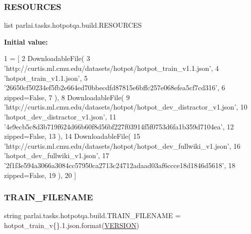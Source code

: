 \mbox{\label{namespaceparlai_1_1tasks_1_1hotpotqa_1_1build_ad02488377cd4fceca268f32a92e7b29c}} 
\subsubsection{\texorpdfstring{R\+E\+S\+O\+U\+R\+C\+ES}{RESOURCES}}
{\footnotesize\ttfamily list parlai.\+tasks.\+hotpotqa.\+build.\+R\+E\+S\+O\+U\+R\+C\+ES}

{\bfseries Initial value\+:}
\begin{DoxyCode}
1 =  [
2     DownloadableFile(
3         \textcolor{stringliteral}{'http://curtis.ml.cmu.edu/datasets/hotpot/hotpot\_train\_v1.1.json'},
4         \textcolor{stringliteral}{'hotpot\_train\_v1.1.json'},
5         \textcolor{stringliteral}{'26650cf50234ef5fb2e664ed70bbecdfd87815e6bffc257e068efea5cf7cd316'},
6         zipped=\textcolor{keyword}{False},
7     ),
8     DownloadableFile(
9         \textcolor{stringliteral}{'http://curtis.ml.cmu.edu/datasets/hotpot/hotpot\_dev\_distractor\_v1.json'},
10         \textcolor{stringliteral}{'hotpot\_dev\_distractor\_v1.json'},
11         \textcolor{stringliteral}{'4e9ecb5c8d3b719f624d66b60f8d56bf227f03914f5f0753d6fa1b359d7104ea'},
12         zipped=\textcolor{keyword}{False},
13     ),
14     DownloadableFile(
15         \textcolor{stringliteral}{'http://curtis.ml.cmu.edu/datasets/hotpot/hotpot\_dev\_fullwiki\_v1.json'},
16         \textcolor{stringliteral}{'hotpot\_dev\_fullwiki\_v1.json'},
17         \textcolor{stringliteral}{'2f1f3e594a3066a3084cc57950ca2713c24712adaad03af6ccce18d1846d5618'},
18         zipped=\textcolor{keyword}{False},
19     ),
20 ]
\end{DoxyCode}
\mbox{\label{namespaceparlai_1_1tasks_1_1hotpotqa_1_1build_a8987e1381df8f7e74c98455c4af7d1e8}} 
\subsubsection{\texorpdfstring{T\+R\+A\+I\+N\+\_\+\+F\+I\+L\+E\+N\+A\+ME}{TRAIN\_FILENAME}}
{\footnotesize\ttfamily string parlai.\+tasks.\+hotpotqa.\+build.\+T\+R\+A\+I\+N\+\_\+\+F\+I\+L\+E\+N\+A\+ME = \textquotesingle{}hotpot\+\_\+train\+\_\+v\{\}.\+1.json\textquotesingle{}.format(\hyperlink{namespaceparlai_1_1tasks_1_1hotpotqa_1_1build_a57a5627d2111821eb32c42f113773b1a}{V\+E\+R\+S\+I\+ON})}

